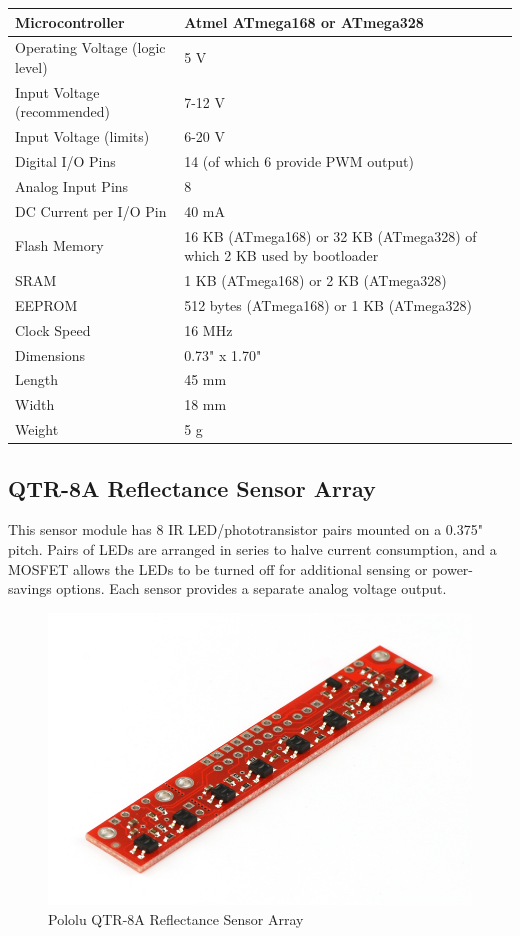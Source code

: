 \documentclass[14pt,a4paper]{extarticle}
\begin{document}
	\begin{tabular}{| p{5cm} | p{12cm} |}

	\hline
	Microcontroller & Atmel ATmega168 or ATmega328 \\ \hline
	Operating Voltage (logic level) & 5 V \\ \hline
	Input Voltage (recommended) &	7-12 V \\ \hline
	Input Voltage (limits)	& 6-20 V \\ \hline
Digital I/O Pins &	14 (of which 6 provide PWM output)\\ \hline
Analog Input Pins &	8 \\ \hline
DC Current per I/O Pin & 40 mA \\ \hline
Flash Memory &	16 KB (ATmega168) or 32 KB (ATmega328) of which 2 KB used by bootloader \\ \hline
SRAM &	1 KB (ATmega168) or 2 KB (ATmega328)\\ \hline
EEPROM	& 512 bytes (ATmega168) or 1 KB (ATmega328)\\ \hline
Clock Speed &	16 MHz \\ \hline
Dimensions &	0.73" x 1.70" \\ \hline
Length &	45 mm\\ \hline
Width &	18 mm\\ \hline
Weight	& 5 g\\ \hline
	
	\end{tabular}

	
	\subsection{QTR-8A Reflectance Sensor Array}
	
	This sensor module has 8 IR LED/phototransistor pairs mounted on a 0.375" pitch. Pairs of LEDs are arranged in series to halve current consumption, and a MOSFET allows the LEDs to be turned off for additional sensing or power-savings options. Each sensor provides a separate analog voltage output.
	
	\begin{figure}[H]
		\includegraphics[scale=.28, center]{qtr.jpg}
		\caption{Pololu QTR-8A Reflectance Sensor Array}
	\end{figure}
	
\end{document}

